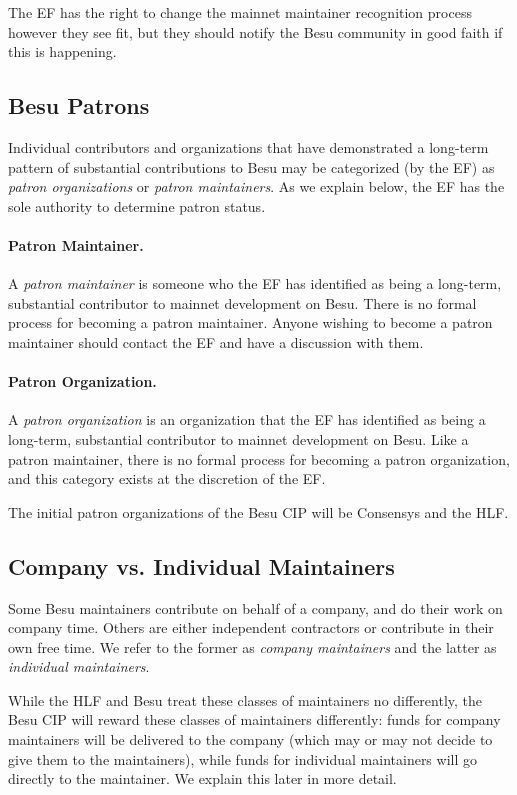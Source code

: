 The EF has the right to change the mainnet maintainer recognition process however they see fit, but they should notify the Besu community in good faith if this is happening.

\subsection{Besu Patrons}
Individual contributors and organizations that have demonstrated a long-term pattern of substantial contributions to Besu may be categorized (by the EF) as \emph{patron organizations} or \emph{patron maintainers}.  As we explain below, the EF has the sole authority to determine patron status.

\paragraph{Patron Maintainer.}  A \emph{patron maintainer} is someone who the EF has identified as being a long-term, substantial contributor to mainnet development on Besu.  There is no formal process for becoming a patron maintainer.  Anyone wishing to become a patron maintainer should contact the EF and have a discussion with them.

\paragraph{Patron Organization.}  A \emph{patron organization} is an organization that the EF has identified as being a long-term, substantial contributor to mainnet development on Besu.  Like a patron maintainer, there is no formal process for becoming a patron organization, and this category exists at the discretion of the EF.

The initial patron organizations of the Besu CIP will be Consensys and the HLF.

\subsection{Company vs. Individual Maintainers}
Some Besu maintainers contribute on behalf of a company, and do their work on company time.  Others are either independent contractors or contribute in their own free time.  We refer to the former as \emph{company maintainers} and the latter as \emph{individual maintainers}.

While the HLF and Besu treat these classes of maintainers no differently, the Besu CIP will reward these classes of maintainers differently:  funds for company maintainers will be delivered to the company (which may or may not decide to give them to the maintainers), while funds for individual maintainers will go directly to the maintainer.  We explain this later in more detail.

